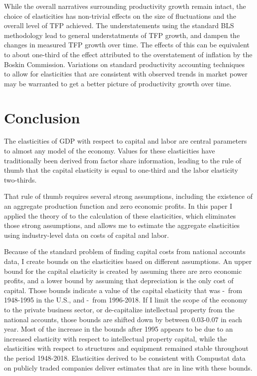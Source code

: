 \documentclass[11pt]{article}
\begin{document}
While the overall narratives surrounding productivity growth remain intact, the choice of elasticities has non-trivial effects on the size of fluctuations and the overall level of TFP achieved. The understatements using the standard BLS methodology lead to general understatments of TFP growth, and dampen the changes in measured TFP growth over time. The effects of this can be equivalent to about one-third of the effect attributed to the overstatement of inflation by the Boskin Commission. Variations on standard productivity accounting techniques to allow for elasticities that are consistent with observed trends in market power may be warranted to get a better picture of productivity growth over time.

\section{Conclusion}\label{SEC_conclusion}
The elasticities of GDP with respect to capital and labor are central parameters to almost any model of the economy. Values for these elasticities have traditionally been derived from factor share information, leading to the rule of thumb that the capital elasticity is equal to one-third and the labor elasticity two-thirds. 

That rule of thumb requires several strong assumptions, including the existence of an aggregate production function and zero economic profits. In this paper I applied the theory of \cite{bfshortnote,bfprodge} to the calculation of these elasticities, which eliminates those strong assumptions, and allows me to estimate the aggregate elasticities using industry-level data on costs of capital and labor. 

Because of the standard problem of finding capital costs from national accounts data, I create bounds on the elasticities based on different assumptions. An upper bound for the capital elasticity is created by assuming there are zero economic profits, and a lower bound by assuming that depreciation is the only cost of capital. Those bounds indicate a value of the capital elasticity that was \baseearlydepr-\baseearlynoprofit \ from 1948-1995 in the U.S., and \baselatedepr-\baselatenoprofit \ from 1996-2018. If I limit the scope of the economy to the private business sector, or de-capitalize intellectual property from the national accounts, those bounds are shifted down by between 0.03-0.07 in each year. Most of the increase in the bounds after 1995 appears to be due to an increased elasticity with respect to intellectual property capital, while the elasticities with respect to structures and equipment remained stable throughout the period 1948-2018. Elasticities derived to be consistent with Compustat data on publicly traded companies deliver estimates that are in line with these bounds.
\end{document}
